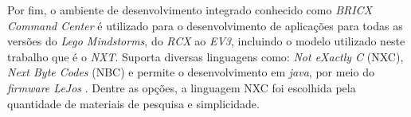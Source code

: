 Por fim, o ambiente de desenvolvimento integrado conhecido como \emph{BRICX Command Center} é utilizado para o desenvolvimento de aplicações para todas as versões do \emph{Lego Mindstorms\textregistered}, do \emph{RCX} ao \emph{EV3}, incluindo o modelo utilizado neste trabalho que é o \emph{NXT}. Suporta diversas linguagens como: \emph{Not eXactly C} (NXC), \emph{Next Byte Codes} (NBC) e permite o desenvolvimento em \emph{java}, por meio do \emph{firmware LeJos} \cite{sorceforge2001}. Dentre as opções, a linguagem NXC foi escolhida pela quantidade de materiais de pesquisa e simplicidade.



